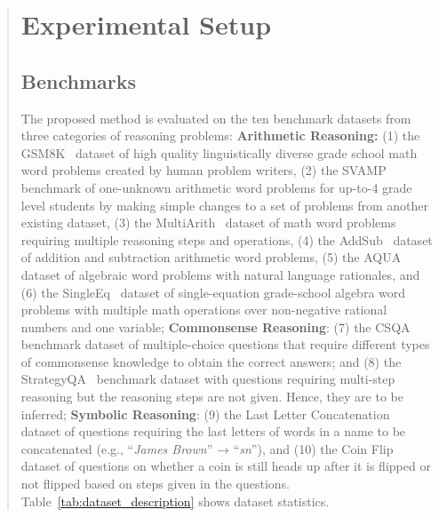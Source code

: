 \documentclass[11pt]{article}
\begin{document}
\begin{abstract}
\section{Experimental Setup}



\subsection{Benchmarks}
The proposed method is evaluated on the ten benchmark datasets from three categories of reasoning problems: 
\textbf{Arithmetic Reasoning:} (1) the {GSM8K}~\citep{gsm8k} dataset of high quality linguistically diverse grade school math word problems created by human problem writers, (2) the {SVAMP}~\citep{svamp} benchmark of one-unknown arithmetic word problems for up-to-4 grade level students by making simple changes to a set of problems from another existing dataset, (3) the {MultiArith}~\citep{mutli_arith} dataset of math word problems requiring multiple reasoning steps and operations, (4) the {AddSub}~\cite{addsub} dataset of addition and subtraction arithmetic word problems, (5) the {AQUA}~\citep{aqua} dataset of algebraic word problems with natural language rationales, and (6) the {SingleEq}~\citep{singleeq} dataset of single-equation grade-school algebra word problems with multiple math operations over non-negative rational numbers and one variable; 
\textbf{Commonsense Reasoning}: (7) the {CSQA}~\citep{commonsenseqa} benchmark dataset of multiple-choice questions that require different types of commonsense knowledge to obtain the correct answers; and (8) the {StrategyQA}~\citep{strategyqa} benchmark dataset with questions requiring multi-step reasoning but the reasoning steps are not given. Hence, they are to be inferred; 
\textbf{Symbolic Reasoning}: (9) the {Last Letter Concatenation}~\cite{cot_wei} dataset of questions requiring the last letters of words in a name to be concatenated (e.g., ``\textit{James Brown}'' → ``\textit{sn}''), and (10) the {Coin Flip}~\cite{cot_wei} dataset of questions on whether a coin is still heads up after it is flipped or not flipped based on steps given in the questions. 
Table~\ref{tab:dataset_description} shows dataset statistics.




\end{abstract}
\end{document}
